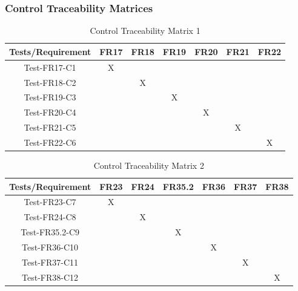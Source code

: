 \documentclass[12pt]{article}
\begin{document}
\subsubsection{Control Traceability Matrices}
\begin{table}[htp]
\centering
\caption{Control Traceability Matrix 1}
\begin{tabular}{|c|c|c|c|c|c|c|}
\hline
Tests/Requirement & FR17 & FR18 & FR19 & FR20 & FR21 & FR22 \\
\hline
Test-FR17-C1      & X    &      &      &      &      &      \\
\hline
Test-FR18-C2      &      & X    &      &      &      &      \\
\hline
Test-FR19-C3      &      &      & X    &      &      &      \\
\hline
Test-FR20-C4      &      &      &      & X    &      &      \\
\hline
Test-FR21-C5      &      &      &      &      & X    &      \\
\hline
Test-FR22-C6      &      &      &      &      &      & X   \\
\hline
\end{tabular}
\end{table}
\begin{table}[htp]
\centering
\caption{Control Traceability Matrix 2}
\begin{tabular}{|c|c|c|c|c|c|c|}
\hline
Tests/Requirement & FR23 & FR24 & FR35.2 & FR36 & FR37 & FR38 \\
\hline
Test-FR23-C7      & X    &      &        &      &      &      \\
\hline
Test-FR24-C8      &      & X    &        &      &      &      \\
\hline
Test-FR35.2-C9    &      &      & X      &      &      &      \\
\hline
Test-FR36-C10     &      &      &        & X    &      &      \\
\hline
Test-FR37-C11     &      &      &        &      & X    &      \\
\hline
Test-FR38-C12     &      &      &        &      &      & X   \\
\hline
\end{tabular}
\end{table}
\newpage
\end{document}
